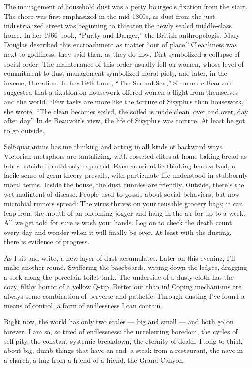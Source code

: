The management of household dust was a petty bourgeois fixation from the
start. The chore was first emphasized in the mid-1800s, as dust from the
just-industrialized street was beginning to threaten the newly sealed
middle-class home. In her 1966 book, ``Purity and Danger,'' the British
anthropologist Mary Douglas described this encroachment as matter ``out
of place.'' Cleanliness was next to godliness, they said then, as they
do now. Dirt symbolized a collapse of social order. The maintenance of
this order usually fell on women, whose level of commitment to dust
management symbolized moral piety, and later, in the inverse,
liberation. In her 1949 book, ``The Second Sex,'' Simone de Beauvoir
suggested that a fixation on housework offered women a flight from
themselves and the world. ``Few tasks are more like the torture of
Sisyphus than housework,'' she wrote. ``The clean becomes soiled, the
soiled is made clean, over and over, day after day.'' In de Beauvoir's
view, the life of Sisyphus was torture. At least he got to go outside.

Self-quarantine has me thinking and acting in all kinds of backward
ways. Victorian metaphors are tantalizing, with cosseted elites at home
baking bread as labor outside is ruthlessly exploited. Even as
scientific thinking has evolved, a facile sense of germ theory prevails,
with particulate life understood in stubbornly moral terms. Inside the
house, the dust bunnies are friendly. Outside, there's the wet malintent
of disease. People used to gossip about social behaviors, but now
microbial rumors spread: The virus thrives on your reusable grocery
bags; it can leap from the mouth of an oncoming jogger and hang in the
air for up to a week. All we get told for sure is wash your hands. Log
on to check the death count every day and wonder when it will finally be
over. At least with the dusting, there is evidence of progress.

As I sit and write, a new layer of dust accumulates. Later on this
evening, I'll make another round, Swiffering the baseboards, wiping down
the ledges, dragging a sock along the porcelain toilet tank. The
underside of a dusty cloth has the cozy, filthy horror of a yellow
Q-tip. Better out than in! Coping mechanisms are always some combination
of perverse and pathetic. Through dusting I've found a means of control,
a form of endlessness I can contain.

Right now, the world has only two scales --- big and small --- and both
go on forever. I am so, so tired of endlessness: the unrelenting
boredom, the cycles of self-pity, the constant systemic breakdown, the
eternity of death. I long to think about big, dumb things that have an
end: a steak from a restaurant, the nave in a church, a hug from a
friend of a friend, the Grand Canyon.

